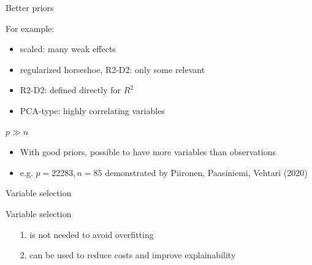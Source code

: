 \documentclass[english,t]{beamer}
\newenvironment{list1}{
   \begin{list}{$\color{list1}\bullet$}{\itemsep=6pt}}{
  \end{list}}
\newenvironment{list2}{
  \begin{list}{-}{\baselineskip=12pt\itemsep=2pt}}{
  \end{list}}
\begin{document}
\begin{frame}{Better priors}

  For example:
  \begin{itemize}
  \item scaled: many weak effects
  \item regularized horseshoe, R2-D2: only some relevant
  \item R2-D2: defined directly for $R^2$
  \item PCA-type: highly correlating variables
  \end{itemize}

\end{frame}


\begin{frame}{$p \gg n$}

  \begin{itemize}
  \item With good priors, possible to have more variables than observations
  \item e.g. $p=22283, n=85$ demonstrated by Piironen, Paasiniemi,
    Vehtari (2020)
  \end{itemize}
\end{frame}


\begin{frame}{Variable selection}
  
  Variable selection
  \begin{itemize}
  \item[1.] is not needed to avoid overfitting
  \item[2.] can be used to reduce costs and improve explainability
  \end{itemize}

\end{frame}


\end{document}
